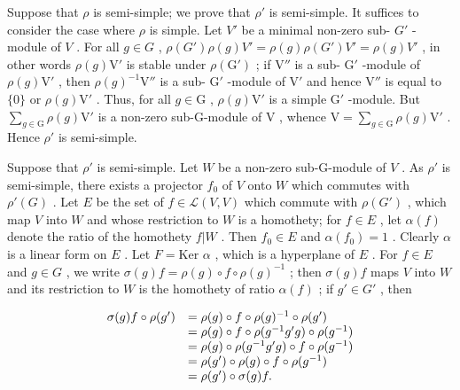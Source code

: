 Suppose that \(\rho\) is semi-simple; we prove that \(\rho'\) is semi-simple. It suffices to consider the case where \(\rho\) is simple. Let \(V'\) be a minimal non-zero sub- \(G'\) -module of \(V\) . For all \(g \in G\) , \(\rho(G') \rho(g)V' = \rho(g)\rho(G')V' = \rho(g)V'\) , in other words \(\rho(g)\mathrm{V}'\) is stable under \(\rho(\mathrm{G}')\) ; if \(\mathrm{V}''\) is a sub- \(\mathrm{G}'\) -module of \(\rho(g)\mathrm{V}'\) , then \(\rho(g)^{-1}\mathrm{V}''\) is a sub- \(\mathrm{G}'\) -module of \(\mathrm{V}'\) and hence \(\mathrm{V}''\) is equal to \(\{0\}\) or \(\rho(g)\mathrm{V}'\) . Thus, for all \(g \in \mathrm{G}\) , \(\rho(g)\mathrm{V}'\) is a simple \(\mathrm{G}'\) -module. But \(\sum_{g \in \mathrm{G}} \rho(g)\mathrm{V}'\) is a non-zero sub-G-module of \(\mathrm{V}\) , whence \(\mathrm{V} = \sum_{g \in \mathrm{G}} \rho(g)\mathrm{V}'\) . Hence \(\rho'\) is semi-simple.

Suppose that \(\rho'\) is semi-simple. Let \(W\) be a non-zero sub-G-module of \(V\) . As \(\rho'\) is semi-simple, there exists a projector \(f_0\) of \(V\) onto \(W\) which commutes with \(\rho'(G)\) . Let \(E\) be the set of \(f \in \mathcal{L}(V, V)\) which commute with \(\rho(G')\) , which map \(V\) into \(W\) and whose restriction to \(W\) is a homothety; for \(f \in E\) , let \(\alpha(f)\) denote the ratio of the homothety \(f|W\) . Then \(f_0 \in E\) and \(\alpha(f_0) = 1\) . Clearly \(\alpha\) is a linear form on \(E\) . Let \(F = \text{Ker } \alpha\) , which is a hyperplane of \(E\) . For \(f \in E\) and \(g \in G\) , we write \(\sigma(g)f = \rho(g) \circ f \circ \rho(g)^{-1}\) ; then \(\sigma(g)f\) maps \(V\) into \(W\) and its restriction to \(W\) is the homothety of ratio \(\alpha(f)\) ; if \(g' \in G'\) , then

\[
\begin{array}{r l} \sigma (g) f \circ \rho (g ^ {\prime}) & = \rho (g) \circ f \circ \rho (g) ^ {- 1} \circ \rho (g ^ {\prime}) \\ & = \rho (g) \circ f \circ \rho (g ^ {- 1} g ^ {\prime} g) \circ \rho (g ^ {- 1}) \\ & = \rho (g) \circ \rho (g ^ {- 1} g ^ {\prime} g) \circ f \circ \rho (g ^ {- 1}) \\ & = \rho (g ^ {\prime}) \circ \rho (g) \circ f \circ \rho (g ^ {- 1}) \\ & = \rho (g ^ {\prime}) \circ \sigma (g) f. \end{array}
\]

